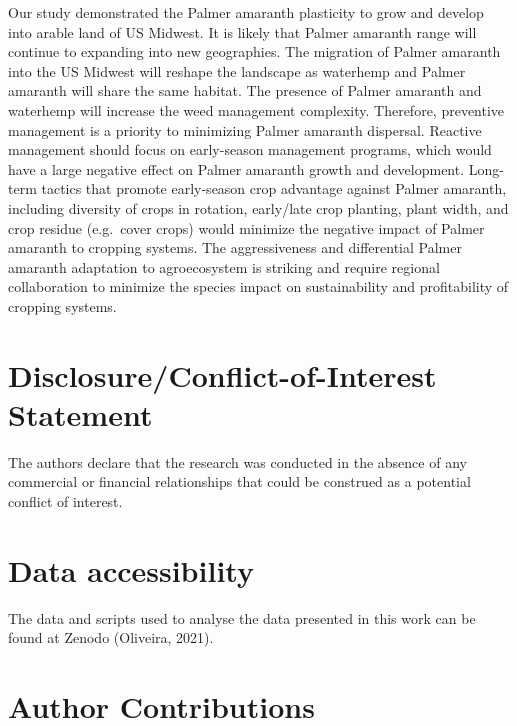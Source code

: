 \documentclass[utf8]{frontiersSCNS}
\begin{document}
Our study demonstrated the Palmer amaranth plasticity to grow and
develop into arable land of US Midwest. It is likely that Palmer
amaranth range will continue to expanding into new geographies. The
migration of Palmer amaranth into the US Midwest will reshape the
landscape as waterhemp and Palmer amaranth will share the same habitat.
The presence of Palmer amaranth and waterhemp will increase the weed
management complexity. Therefore, preventive management is a priority to
minimizing Palmer amaranth dispersal. Reactive management should focus
on early-season management programs, which would have a large negative
effect on Palmer amaranth growth and development. Long-term tactics that
promote early-season crop advantage against Palmer amaranth, including
diversity of crops in rotation, early/late crop planting, plant width,
and crop residue (e.g.~cover crops) would minimize the negative impact
of Palmer amaranth to cropping systems. The aggressiveness and
differential Palmer amaranth adaptation to agroecosystem is striking and
require regional collaboration to minimize the species impact on
sustainability and profitability of cropping systems.

\hypertarget{disclosureconflict-of-interest-statement}{%
\section*{Disclosure/Conflict-of-Interest
Statement}\label{disclosureconflict-of-interest-statement}}

The authors declare that the research was conducted in the absence of
any commercial or financial relationships that could be construed as a
potential conflict of interest.

\hypertarget{data-accessibility}{%
\section*{Data accessibility}\label{data-accessibility}}

The data and scripts used to analyse the data presented in this work can
be found at Zenodo (Oliveira, 2021).

\hypertarget{author-contributions}{%
\section*{Author Contributions}\label{author-contributions}}
\end{document}
